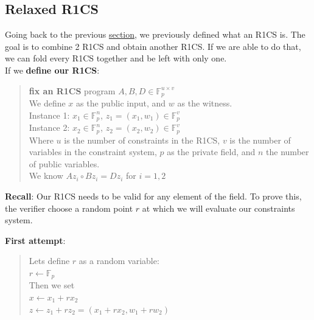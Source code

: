 \subsection{Relaxed R1CS}
Going back to the previous \hyperref[subsec:r1cs]{section}, we previously defined what an R1CS is.
The goal is to combine 2 R1CS and obtain another R1CS. If we are able to do that, we can fold every R1CS together and be left with only one.
\\

If we \textbf{define our R1CS}:
\begin{quote}
\textbf{fix an R1CS} program $A,B,D \in \mathbb{F}^{u \times v}_p $
\\
We define $x$ as the public input, and $w$ as the witness.
\\
Instance 1: $ x_1 \in \mathbb{F}^n_p $, $ z_1 = (x_1, w_1) \in \mathbb{F}^v_p$
\\
Instance 2: $x_2 \in \mathbb{F}^n_p $, $ z_2 = (x_2, w_2) \in \mathbb{F}^v_p$
\\
Where $u$ is the number of constraints in the R1CS, $v$ is the number of variables in the constraint system, $p$ as the private field, and $n$ the number of public variables.
\\
We know $Az_i \circ Bz_i = Dz_i$ for $ i = 1,2$
\end{quote}


\textbf{Recall}: Our R1CS needs to be valid for any element of the field.
To prove this, the verifier choose a random point $r$ at which we will evaluate our constraints system.

\textbf{First attempt}:
\begin{quote}
Lets define $r$ as a random variable:
\\
$r \leftarrow \mathbb{F}_p$
\\
Then we set 
\\
$x \leftarrow x_1+rx_2$
\\
$z \leftarrow z_1 + rz_2 = (x_1+rx_2, w_1 + rw_2)$
\end{quote}


